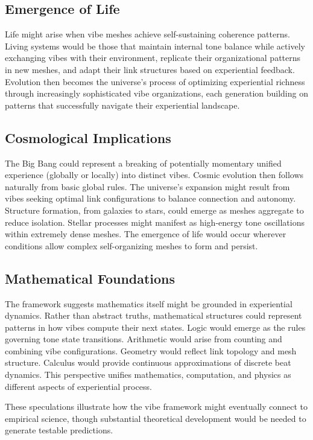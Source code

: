 \subsection{Emergence of Life}

Life might arise when vibe meshes achieve self-sustaining coherence patterns. Living systems would be those that maintain internal tone balance while actively exchanging vibes with their environment, replicate their organizational patterns in new meshes, and adapt their link structures based on experiential feedback. Evolution then becomes the universe's process of optimizing experiential richness through increasingly sophisticated vibe organizations, each generation building on patterns that successfully navigate their experiential landscape.

\subsection{Cosmological Implications}

The Big Bang could represent a breaking of potentially momentary unified experience (globally or locally) into distinct vibes. Cosmic evolution then follows naturally from basic global rules. The universe's expansion might result from vibes seeking optimal link configurations to balance connection and autonomy. Structure formation, from galaxies to stars, could emerge as meshes aggregate to reduce isolation. Stellar processes might manifest as high-energy tone oscillations within extremely dense meshes. The emergence of life would occur wherever conditions allow complex self-organizing meshes to form and persist.

\subsection{Mathematical Foundations}

The framework suggests mathematics itself might be grounded in experiential dynamics. Rather than abstract truths, mathematical structures could represent patterns in how vibes compute their next states. Logic would emerge as the rules governing tone state transitions. Arithmetic would arise from counting and combining vibe configurations. Geometry would reflect link topology and mesh structure. Calculus would provide continuous approximations of discrete beat dynamics. This perspective unifies mathematics, computation, and physics as different aspects of experiential process.

These speculations illustrate how the vibe framework might eventually connect to empirical science, though substantial theoretical development would be needed to generate testable predictions.
